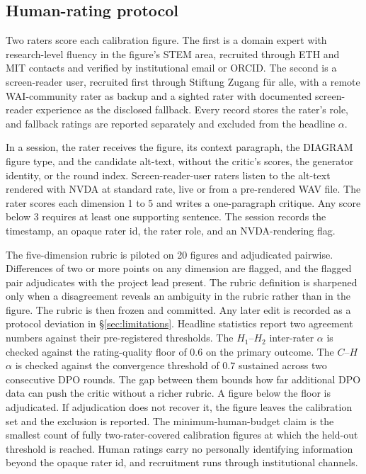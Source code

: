 \documentclass[pdflatex,sn-mathphys-num]{sn-jnl}
\begin{document}
\begin{appendices}
\section{Human-rating protocol}\label{app:human}
\setcounter{figure}{0}\setcounter{table}{0}

Two raters score each calibration figure. The first is a domain expert with research-level fluency in the figure's STEM area, recruited through ETH and MIT contacts and verified by institutional email or ORCID. The second is a screen-reader user, recruited first through Stiftung Zugang f\"ur alle, with a remote WAI-community rater as backup and a sighted rater with documented screen-reader experience as the disclosed fallback. Every record stores the rater's role, and fallback ratings are reported separately and excluded from the headline $\alpha$.

In a session, the rater receives the figure, its context paragraph, the DIAGRAM figure type, and the candidate alt-text, without the critic's scores, the generator identity, or the round index. Screen-reader-user raters listen to the alt-text rendered with NVDA at standard rate, live or from a pre-rendered WAV file. The rater scores each dimension 1 to 5 and writes a one-paragraph critique. Any score below 3 requires at least one supporting sentence. The session records the timestamp, an opaque rater id, the rater role, and an NVDA-rendering flag.

The five-dimension rubric is piloted on 20 figures and adjudicated pairwise. Differences of two or more points on any dimension are flagged, and the flagged pair adjudicates with the project lead present. The rubric definition is sharpened only when a disagreement reveals an ambiguity in the rubric rather than in the figure. The rubric is then frozen and committed. Any later edit is recorded as a protocol deviation in \S\ref{sec:limitations}. Headline statistics report two agreement numbers against their pre-registered thresholds. The $H_1$--$H_2$ inter-rater $\alpha$ is checked against the rating-quality floor of $0.6$ on the primary outcome. The $C$--$H$ $\alpha$ is checked against the convergence threshold of $0.7$ sustained across two consecutive DPO rounds. The gap between them bounds how far additional DPO data can push the critic without a richer rubric. A figure below the floor is adjudicated. If adjudication does not recover it, the figure leaves the calibration set and the exclusion is reported. The minimum-human-budget claim is the smallest count of fully two-rater-covered calibration figures at which the held-out threshold is reached. Human ratings carry no personally identifying information beyond the opaque rater id, and recruitment runs through institutional channels.


\end{appendices}
\end{document}
